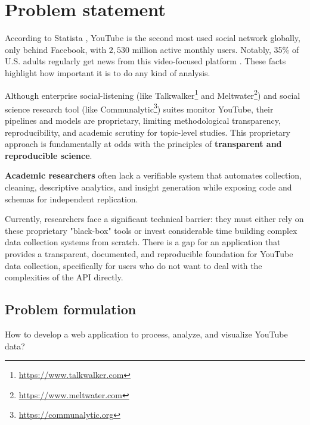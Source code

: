 \section{Problem statement}

According to Statista \cite{statista2025social}, YouTube is the second most used social network globally, only behind Facebook, with $2,530$ million active monthly users. Notably, 35\% of U.S. adults regularly get news from this video-focused platform \cite{pewresearch2025social}. These facts highlight how important it is to do any kind of analysis.

Although enterprise social-listening (like {Talkwalker}\footnote{\url{https://www.talkwalker.com}} and {Meltwater}\footnote{\url{https://www.meltwater.com}}) and social science research tool (like {Communalytic}\footnote{\url{https://communalytic.org}}) suites monitor YouTube, their pipelines and models are proprietary, limiting methodological transparency, reproducibility, and academic scrutiny for topic-level studies. This proprietary approach is fundamentally at odds with the principles of \textbf{transparent and reproducible science}.

\textbf{Academic researchers} often lack a verifiable system that automates collection, cleaning, descriptive analytics, and insight generation while exposing code and schemas for independent replication.

Currently, researchers face a significant technical barrier: they must either rely on these proprietary "black-box" tools or invest considerable time building complex data collection systems from scratch. There is a gap for an application that provides a transparent, documented, and reproducible foundation for YouTube data collection, specifically for users who do not want to deal with the complexities of the API directly.

\subsection{Problem formulation}

How to develop a web application to process, analyze, and visualize YouTube data?
